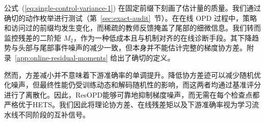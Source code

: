 公式~(\ref{eq:single-control-variance-1}) 在固定前缀下刻画了估计量的质量。我们通过确切的动作枚举进行测试（第~\ref{sec:exact-audit}~节）。在在线 OPD 过程中，策略和访问过的前缀均发生变化，而稀疏的教师反馈掩盖了尾部的细微信息。我们转而监控残差的二阶矩 \(M_2\)，作为一种低成本且与机制对齐的在线诊断手段。其下降趋势与头部与尾部事件噪声的减少一致，但本身并不能估计完整的梯度协方差。附录~\ref{app:online-residual-moments} 给出了确切的定义。

然而，方差减小并不意味着下游准确率的单调提升。降低协方差迹可以减少随机优化噪声，但最终性能仍受训练动态和解码随机性的影响，而这两者均通过基准评分进行了离散化。因此，ResOPD能够可靠地抑制梯度噪声，而无需在每个检查点都严格优于HETS。我们因此将理论协方差、在线残差矩以及下游准确率视为学习流水线不同阶段的互补信号。
